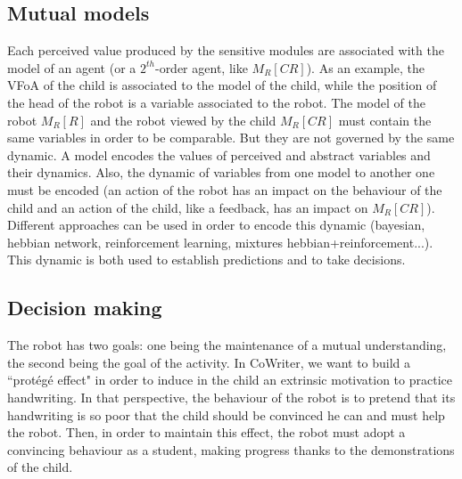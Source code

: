 \documentclass[10pt,a4paper]{article}
\begin{document}
\subsection{Mutual models}
\label{ssec:mmm}
Each perceived value produced by the sensitive modules are associated with the model of an agent (or a $2^{th}$-order agent, like $M_R\left[CR\right]$). As an example, the VFoA of the child is associated to the model of the child, while the position of the head of the robot is a variable associated to the robot.
The model of the robot $M_R\left[R\right]$ and the robot viewed by the child $M_R\left[CR\right]$ must contain the same variables in order to be comparable. But they are not governed by the same dynamic.
A model encodes the values of perceived and abstract variables and their dynamics. Also, the dynamic of variables from one model to another one must be encoded (an action of the robot has an impact on the behaviour of the child and an action of the child, like a feedback, has an impact on $M_R\left[CR\right]$). Different approaches can be used in order to encode this dynamic (bayesian, hebbian network, reinforcement learning, mixtures hebbian+reinforcement...). This dynamic is both used to establish predictions and to take decisions.

\subsection{Decision making}
\label{ssec:decision}

The robot has two goals: one being the maintenance of a mutual understanding, the second being the goal of the activity.
In CoWriter, we want to build a ``prot\'eg\'e effect" in order to induce in the child an extrinsic motivation to practice handwriting. 
In that perspective, the behaviour of the robot is to pretend that its handwriting is so poor that the child should be convinced he can and must help the robot. Then, in order to maintain this effect, the robot must adopt a convincing behaviour as a student, making progress thanks to the demonstrations of the child. 
\end{document}
